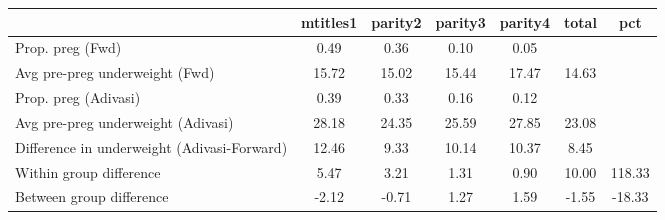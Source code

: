 \begin{tabular}{l*{6}{c}}
\toprule
            &\multicolumn{1}{c}{mtitles1}&\multicolumn{1}{c}{parity2}&\multicolumn{1}{c}{parity3}&\multicolumn{1}{c}{parity4}&\multicolumn{1}{c}{total}&\multicolumn{1}{c}{pct}\\
\midrule
\midrule
Prop. preg (Fwd)&        0.49&        0.36&        0.10&        0.05&            &            \\
Avg pre-preg underweight (Fwd)&       15.72&       15.02&       15.44&       17.47&       14.63&            \\
Prop. preg (Adivasi)&        0.39&        0.33&        0.16&        0.12&            &            \\
Avg pre-preg underweight (Adivasi)&       28.18&       24.35&       25.59&       27.85&       23.08&            \\
Difference in underweight (Adivasi-Forward)&       12.46&        9.33&       10.14&       10.37&        8.45&            \\
Within group difference&        5.47&        3.21&        1.31&        0.90&       10.00&      118.33\\
Between group difference&       -2.12&       -0.71&        1.27&        1.59&       -1.55&      -18.33\\
\bottomrule
\end{tabular}
